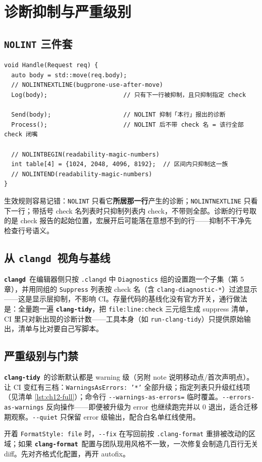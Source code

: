 \documentclass[12pt,a4paper,fontset=fandol]{ctexbook}
\newcommand{\Opt}[1]{\texttt{-\/-#1}}
\newcommand{\Lib}[1]{\textbf{\texttt{#1}}}
\newcommand{\Tidy}{\Lib{clang-tidy}}
\newcommand{\Fmt}{\Lib{clang-format}}
\newcommand{\CD}{\Lib{clangd}}
\begin{document}
\section{诊断抑制与严重级别}\label{sec:ch12-s5}
\subsection{\texttt{NOLINT} 三件套}\label{sec:ch12-s5a}
\begin{lstlisting}[style=cppstyle,caption={三种抑制写法与它们的生效范围},label={lst:ch12-nolint}]
void Handle(Request req) {
  auto body = std::move(req.body);
  // NOLINTNEXTLINE(bugprone-use-after-move)
  Log(body);                     // 只有下一行被抑制，且只抑制指定 check

  Send(body);                    // NOLINT 抑制「本行」报出的诊断
  Process();                     // NOLINT 后不带 check 名 = 该行全部 check 闭嘴

  // NOLINTBEGIN(readability-magic-numbers)
  int table[4] = {1024, 2048, 4096, 8192};  // 区间内只抑制这一族
  // NOLINTEND(readability-magic-numbers)
}
\end{lstlisting}
生效规则容易记错：\texttt{NOLINT} 只看它\textbf{所居那一行}产生的诊断；\texttt{NOLINTNEXTLINE} 只看下一行；带括号 check 名列表时只抑制列表内 check，不带则全部。诊断的行号取的是 check 报告的起始位置，宏展开后可能落在意想不到的行——抑制不干净先检查行号语义。
\subsection{从 \CD\ 视角与基线}\label{sec:ch12-s5b}
\CD\ 在编辑器侧只按 \texttt{.clangd} 中 \texttt{Diagnostics} 组的设置跑一个子集（第 5 章），并用同组的 \texttt{Suppress} 列表按 check 名（含 \texttt{clang-diagnostic-*}）过滤显示——这是显示层抑制，不影响 CI。存量代码的基线化没有官方开关，通行做法是：全量跑一遍 \Tidy ，把 \texttt{file:line:check} 三元组生成 suppress 清单，CI 里只对新出现的诊断计数——工具本身（如 \texttt{run-clang-tidy}）只提供原始输出，清单与比对要自己写脚本。
\subsection{严重级别与门禁}\label{sec:ch12-s5c}
\Tidy\ 的诊断默认都是 warning 级（另附 note 说明移动点/首次声明点）。让 CI 变红有三档：\texttt{WarningsAsErrors: '*'} 全部升级；指定列表只升级红线项（见清单 \ref{lst:ch12-full}）；命令行 \Opt{warnings-as-errors=} 临时覆盖。\Opt{errors-as-warnings} 反向操作——即便被升级为 error 也继续跑完并以 0 退出，适合迁移期观察。\Opt{quiet} 只保留 error 级输出，配合白名单红线使用。
\begin{warning}[title={autofix 会顺手重排整个 include 块}]
开着 \texttt{FormatStyle: file} 时，\Opt{fix} 在写回前按 \texttt{.clang-format} 重排被改动的区域；如果 \Fmt\ 配置与团队现用风格不一致，一次修复会制造几百行无关 diff。先对齐格式化配置，再开 autofix。
\end{warning}
\end{document}

